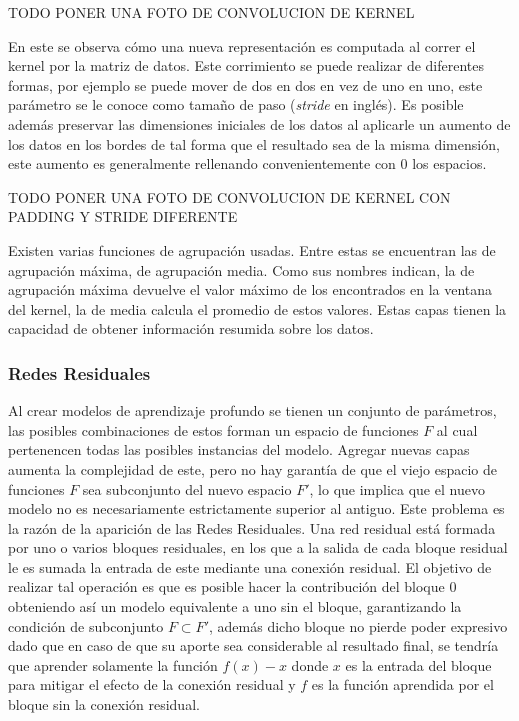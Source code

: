 TODO PONER UNA FOTO DE CONVOLUCION DE KERNEL

En este se observa cómo una nueva representación es computada al correr el kernel por la matriz de datos. Este
corrimiento se puede realizar de diferentes formas, por ejemplo se puede mover de dos en dos en vez de uno en uno, este
parámetro se le conoce como tamaño de paso (\emph{stride} en inglés). Es posible además preservar las dimensiones
iniciales de los datos al aplicarle un aumento de los datos en los bordes de tal forma que el resultado sea de la misma
dimensión, este aumento es generalmente rellenando convenientemente con 0 los espacios.

TODO PONER UNA FOTO DE CONVOLUCION DE KERNEL CON PADDING Y STRIDE DIFERENTE

Existen varias funciones de agrupación usadas. Entre estas se encuentran las de agrupación máxima, de 
agrupación media. Como sus nombres indican, la de agrupación máxima devuelve el valor máximo de los encontrados
en la ventana del kernel, la de media calcula el promedio de estos valores. Estas capas tienen la capacidad de obtener
información resumida sobre los datos.

\subsubsection{Redes Residuales}

Al crear modelos de aprendizaje profundo se tienen un conjunto de parámetros, las posibles combinaciones 
de estos forman un espacio de funciones $F$ al cual pertenencen todas las posibles instancias del modelo.
Agregar nuevas capas aumenta la complejidad de este, pero no hay garantía de que el viejo espacio 
de funciones $F$ sea subconjunto del nuevo espacio $F'$, lo que implica que el nuevo modelo no es necesariamente
estrictamente superior al antiguo. Este problema es la razón de la aparición de las Redes Residuales. 
Una red residual está formada por 
uno o varios bloques residuales, en los que a la salida de cada bloque residual le es sumada la entrada de 
este mediante una conexión residual.
El objetivo de realizar tal operación es que es posible hacer la contribución del bloque 0 obteniendo así
un modelo equivalente a uno sin el bloque, garantizando la condición de subconjunto $F \subset F'$, además 
dicho bloque no pierde poder expresivo dado que en caso de que su aporte sea considerable al resultado final, 
se tendría que aprender solamente la función $f(x) - x$ donde $x$ es la entrada del bloque para mitigar el 
efecto de la conexión residual y $f$ es la función aprendida por el bloque sin la conexión residual.

